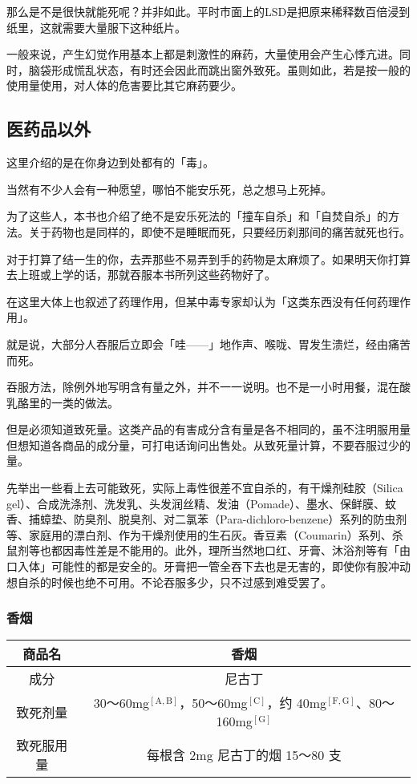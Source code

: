 \documentclass[UTF8]{ctexart}
\begin{document}
那么是不是很快就能死呢？并非如此。平时市面上的LSD是把原来稀释数百倍浸到纸里，这就需要大量服下这种纸片。

一般来说，产生幻觉作用基本上都是刺激性的麻药，大量使用会产生心悸亢进。同时，脑袋形成慌乱状态，有时还会因此而跳出窗外致死。虽则如此，若是按一般的使用量使用，对人体的危害要比其它麻药要少。

\subsection{医药品以外}

这里介绍的是在你身边到处都有的「毒」。

当然有不少人会有一种愿望，哪怕不能安乐死，总之想马上死掉。

为了这些人，本书也介绍了绝不是安乐死法的「撞车自杀」和「自焚自杀」的方法。关于药物也是同样的，即使不是睡眠而死，只要经历刹那间的痛苦就死也行。

对于打算了结一生的你，去弄那些不易弄到手的药物是太麻烦了。如果明天你打算去上班或上学的话，那就吞服本书所列这些药物好了。

在这里大体上也叙述了药理作用，但某中毒专家却认为「这类东西没有任何药理作用」。

就是说，大部分人吞服后立即会「哇——」地作声、喉咙、胃发生溃烂，经由痛苦而死。

吞服方法，除例外地写明含有量之外，并不一一说明。也不是一小时用餐，混在酸乳酪里的一类的做法。

但是必须知道致死量。这类产品的有害成分含有量是各不相同的，虽不注明服用量但想知道各商品的成分量，可打电话询问出售处。从致死量计算，不要吞服过少的量。

先举出一些看上去可能致死，实际上毒性很差不宜自杀的，有干燥剂硅胶（Silica gel）、合成洗涤剂、洗发乳、头发润丝精、发油（Pomade）、墨水、保鲜膜、蚊香、捕蟑垫、防臭剂、脱臭剂、对二氯苯（Para-dichloro-benzene）系列的防虫剂等、家庭用的漂白剂、作为干燥剂使用的生石灰。香豆素（Coumarin）系列、杀鼠剂等也都因毒性差是不能用的。此外，理所当然地口红、牙膏、沐浴剂等有「由口入体」可能性的都是安全的。牙膏把一管全吞下去也是无害的，即使你有股冲动想自杀的时候也绝不可用。不论吞服多少，只不过感到难受罢了。

\subsubsection*{香烟}

\begin{table}[htbp]
\begin{center}
\begin{tabular}{cc}

\toprule
商品名 & 香烟 \\
\midrule
成分 & 尼古丁 \\
致死剂量 & 30～60mg$^\mathrm{[A,B]}$，50～60mg$^\mathrm{[C]}$，约 40mg$^\mathrm{[F,G]}$、80～160mg$^\mathrm{[G]}$ \\
致死服用量 & 每根含 2mg 尼古丁的烟 15～80 支 \\
\bottomrule
\end{tabular}
\end{center}
\end{table}
\end{document}
